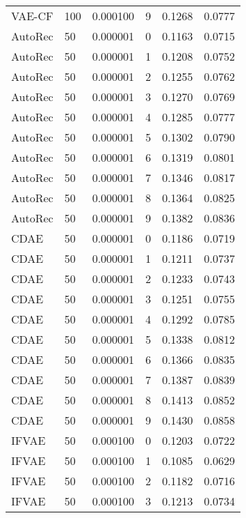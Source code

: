 \begin{tabular}{llrlrr}
  VAE-CF &  100 &  0.000100 &     9 &  0.1268 &       0.0777 \\
 AutoRec &   50 &  0.000001 &     0 &  0.1163 &       0.0715 \\
 AutoRec &   50 &  0.000001 &     1 &  0.1208 &       0.0752 \\
 AutoRec &   50 &  0.000001 &     2 &  0.1255 &       0.0762 \\
 AutoRec &   50 &  0.000001 &     3 &  0.1270 &       0.0769 \\
 AutoRec &   50 &  0.000001 &     4 &  0.1285 &       0.0777 \\
 AutoRec &   50 &  0.000001 &     5 &  0.1302 &       0.0790 \\
 AutoRec &   50 &  0.000001 &     6 &  0.1319 &       0.0801 \\
 AutoRec &   50 &  0.000001 &     7 &  0.1346 &       0.0817 \\
 AutoRec &   50 &  0.000001 &     8 &  0.1364 &       0.0825 \\
 AutoRec &   50 &  0.000001 &     9 &  0.1382 &       0.0836 \\
    CDAE &   50 &  0.000001 &     0 &  0.1186 &       0.0719 \\
    CDAE &   50 &  0.000001 &     1 &  0.1211 &       0.0737 \\
    CDAE &   50 &  0.000001 &     2 &  0.1233 &       0.0743 \\
    CDAE &   50 &  0.000001 &     3 &  0.1251 &       0.0755 \\
    CDAE &   50 &  0.000001 &     4 &  0.1292 &       0.0785 \\
    CDAE &   50 &  0.000001 &     5 &  0.1338 &       0.0812 \\
    CDAE &   50 &  0.000001 &     6 &  0.1366 &       0.0835 \\
    CDAE &   50 &  0.000001 &     7 &  0.1387 &       0.0839 \\
    CDAE &   50 &  0.000001 &     8 &  0.1413 &       0.0852 \\
    CDAE &   50 &  0.000001 &     9 &  0.1430 &       0.0858 \\
   IFVAE &   50 &  0.000100 &     0 &  0.1203 &       0.0722 \\
   IFVAE &   50 &  0.000100 &     1 &  0.1085 &       0.0629 \\
   IFVAE &   50 &  0.000100 &     2 &  0.1182 &       0.0716 \\
   IFVAE &   50 &  0.000100 &     3 &  0.1213 &       0.0734 \\

\end{tabular}
